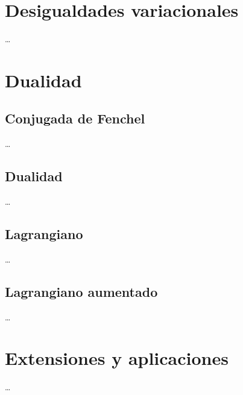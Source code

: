 \documentclass[11pt]{report}
\begin{document}
\chapter{Desigualdades variacionales}

\dots

\chapter{Dualidad}

\section{Conjugada de Fenchel}

\dots 

\section{Dualidad}

\dots

\section{Lagrangiano}

\dots

\section{Lagrangiano aumentado}

\dots

\chapter{Extensiones y aplicaciones}

\dots
\end{document}
